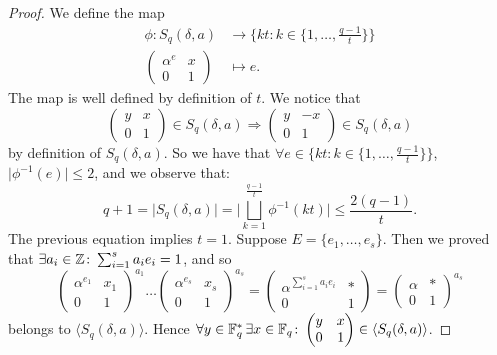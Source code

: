 \begin{theorem}
\begin{proof}
We define the map
\begin{align*}
	\phi \colon  S_q(\delta,a) &\longrightarrow \{kt \colon k \in \{1, \dots ,\frac{q-1}{t}\}\}\\
				 \begin{pmatrix} \alpha^e & x \\ 0 & 1 \end{pmatrix} &\longmapsto e.
\end{align*}
The map is well defined by definition of $t$.
We notice that
\begin{equation}\label{double}
\begin{pmatrix} y & x \\ 0 & 1 \end{pmatrix} \in S_q(\delta,a) \Rightarrow \begin{pmatrix} y & -x \\ 0 & 1 \end{pmatrix} \in S_q(\delta,a)
\end{equation}
by definition of $S_q(\delta,a)$. So we have that
$\forall e \in \{kt \colon k \in \{1, \dots ,\frac{q-1}{t}\}\}$, $\vert \phi^{-1}(e)\vert \le 2$, and we observe that:
\begin{equation*}
	q+1 = \vert S_q(\delta,a)\vert = \big\vert \bigsqcup_{k=1}^{\frac{q-1}{t}} \phi^{-1}(kt) \big\vert \le \frac{2(q-1)}{t}.
\end{equation*}
The previous equation implies $t=1$.
Suppose $E=\{e_1,\dots, e_s\}$. Then we proved that $\exists a_i \in {\mathbb Z} \colon \sum_{i=1}^s a_i e_i =1$, and so
\begin{equation}
	\begin{pmatrix} \alpha^{e_1} & x_1 \\ 0 & 1 \end{pmatrix}^{a_1} \dots 
	\begin{pmatrix} \alpha^{e_s} & x_s \\ 0 & 1 \end{pmatrix}^{a_s}=
	\begin{pmatrix} \alpha^{\sum_{i=1}^s a_i e_i} & * \\ 0 & 1 \end{pmatrix}=
	\begin{pmatrix} \alpha & * \\ 0 & 1 \end{pmatrix}^{a_s}
\end{equation}
 belongs to $\langle S_q(\delta,a) \rangle$. Hence $\forall y \in {\mathbb F}_q^{*}\, \exists x \in {\mathbb F}_q \colon 
 \begin{pmatrix} y & x \\ 0 & 1 \end{pmatrix} \in \langle S_q(\delta,a) \rangle$. 


\end{proof}
\end{theorem}
